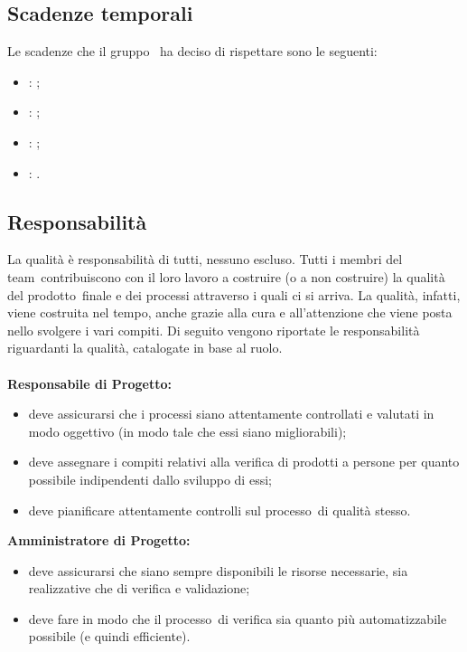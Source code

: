 \documentclass[../PianoDiQualifica.tex]{subfiles}
\begin{document}
	\subsection{Scadenze temporali}
	Le scadenze che il gruppo \leaf\ ha deciso di rispettare sono le seguenti:
	\begin{itemize}
		\item \revisionedeirequisiti: ;
		\item \revisionediprogettazione: ;
		\item \revisionediqualifica: ;
		\item \revisionediaccettazione: .
	\end{itemize}
	\subsection{Responsabilità}
		La qualità è responsabilità di tutti, nessuno escluso. Tutti i membri del team\g\ contribuiscono con il loro lavoro a costruire (o a non costruire) la qualità del prodotto\g\ finale e dei processi attraverso i quali ci si arriva. La qualità, infatti, viene costruita nel tempo, anche grazie alla cura e all'attenzione che viene posta nello svolgere i vari compiti.
		Di seguito vengono riportate le responsabilità riguardanti la qualità, catalogate in base al ruolo.
		\\\\\textbf{Responsabile di Progetto:}
			 \begin{itemize}
				\item deve assicurarsi che i processi siano attentamente controllati e valutati in modo oggettivo (in modo tale che essi siano migliorabili);
				\item deve assegnare i compiti relativi alla verifica di prodotti a persone per quanto possibile indipendenti dallo sviluppo di essi;
				\item deve pianificare attentamente controlli sul processo\g\ di qualità stesso.
			\end{itemize}
 			\textbf{Amministratore di Progetto:}
			\begin{itemize}
				\item deve assicurarsi che siano sempre disponibili le risorse necessarie, sia realizzative che di verifica e validazione;
				\item deve fare in modo che il processo\g\ di verifica sia quanto più automatizzabile possibile (e quindi efficiente).
			\end{itemize}
\end{document}
